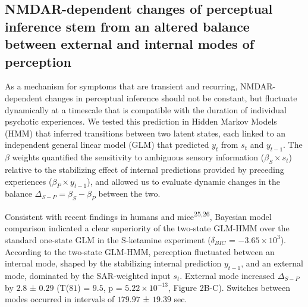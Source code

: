 \documentclass[
]{article}
\begin{document}
\subsection{NMDAR-dependent changes of perceptual inference stem from an
altered balance between external and internal modes of
perception}\label{nmdar-dependent-changes-of-perceptual-inference-stem-from-an-altered-balance-between-external-and-internal-modes-of-perception}

As a mechanism for symptoms that are transient and recurring,
NMDAR-dependent changes in perceptual inference should not be constant,
but fluctuate dynamically at a timescale that is compatible with the
duration of individual psychotic experiences. We tested this prediction
in Hidden Markov Models (HMM) that inferred transitions between two
latent states, each linked to an independent general linear model (GLM)
that predicted \(y_t\) from \(s_t\) and \(y_{t-1}\). The \(\beta\)
weights quantified the sensitivity to ambiguous sensory information
(\(\beta_S \times s_t\)) relative to the stabilizing effect of internal
predictions provided by preceding experiences
(\(\beta_{P} \times y_{t-1}\)), and allowed us to evaluate dynamic
changes in the balance \(\Delta_{S-P} = \beta_S - \beta_P\) between the
two.

Consistent with recent findings in humans and
mice\textsuperscript{25,26}, Bayesian model comparison indicated a clear
superiority of the two-state GLM-HMM over the standard one-state GLM in
the S-ketamine experiment (\(\delta_{BIC}\) =
\(\ensuremath{-3.65\times 10^{3}}\)). According to the two-state
GLM-HMM, perception fluctuated between an internal mode, shaped by the
stabilizing internal prediction \(y_{t-1}\), and an external mode,
dominated by the SAR-weighted input \(s_t\). External mode increased
\(\Delta_{S-P}\) by \(2.8\) ± \(0.29\) (T(\(81\)) = \(9.5\), p =
\(\ensuremath{5.22\times 10^{-13}}\), Figure 2B-C). Switches between
modes occurred in intervals of \(179.97\) ± \(19.39\) sec.~
\end{document}
